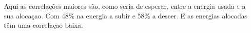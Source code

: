 % 

Aqui as correlações maiores são, como seria de esperar, entre a energia usada e a sua alocaçao. Com 48\% na energia a subir e 58\% a descer. E as energias alocadas têm uma correlaçao baixa.\par 







